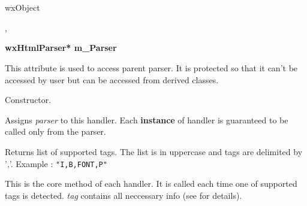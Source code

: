 %
%

\section{}\label{wxhtmltaghandler}


wxObject


,


\label{wxhtmltaghandlermparser}

{\bf wxHtmlParser* m\_Parser}

This attribute is used to access parent parser. It is protected so that
it can't be accessed by user but can be accessed from derived classes.

\label{wxhtmltaghandlerwxhtmltaghandler}


Constructor.

\label{wxhtmltaghandlersetparser}


Assigns {\it parser} to this handler. Each {\bf instance} of handler 
is guaranteed to be called only from the parser.

\label{wxhtmltaghandlergetsupportedtags}


Returns list of supported tags. The list is in uppercase and tags
are delimited by ','. Example : {\tt "I,B,FONT,P" }

\label{wxhtmltaghandlerhandletag}


This is the core method of each handler. It is called each time
one of supported tags is detected. {\it tag} contains all neccessary
info (see  for details).

